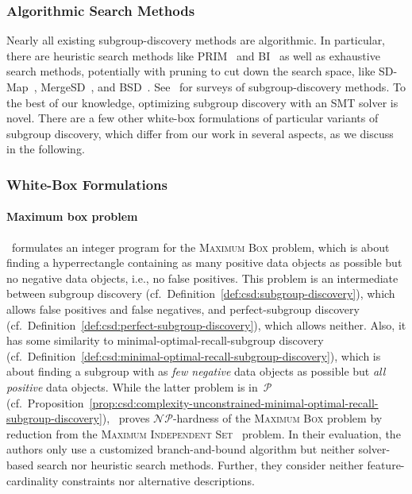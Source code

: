 \documentclass{article}
\theoremstyle{definition}
\begin{document}
\subsubsection{Algorithmic Search Methods}
\label{sec:csd:related-work:subgroup-discovery:algorithmic-methods}

Nearly all existing subgroup-discovery methods are algorithmic.
In particular, there are heuristic search methods like PRIM~\cite{friedman1999bump} and BI~\cite{mampaey2012efficient} as well as exhaustive search methods, potentially with pruning to cut down the search space, like SD-Map~\cite{atzmueller2009fast, atzmueller2006sd}, MergeSD~\cite{grosskreutz2009subgroup}, and BSD~\cite{lemmerich2016fast, lemmerich2010fast}.
See~\cite{atzmueller2015subgroup, helal2016subgroup, herrera2011overview, ventura2018subgroup} for surveys of subgroup-discovery methods.
To the best of our knowledge, optimizing subgroup discovery with an SMT solver is novel.
There are a few other white-box formulations of particular variants of subgroup discovery, which differ from our work in several aspects, as we discuss in the following.

\subsubsection{White-Box Formulations}
\label{sec:csd:related-work:subgroup-discovery:white-box}

\paragraph{Maximum box problem}

\cite{eckstein2002maximum}~formulates an integer program for the \textsc{Maximum Box} problem, which is about finding a hyperrectangle containing as many positive data objects as possible but no negative data objects, i.e., no false positives.
This problem is an intermediate between subgroup discovery (cf.~Definition~\ref{def:csd:subgroup-discovery}), which allows false positives and false negatives, and perfect-subgroup discovery (cf.~Definition~\ref{def:csd:perfect-subgroup-discovery}), which allows neither.
Also, it has some similarity to minimal-optimal-recall-subgroup discovery (cf.~Definition~\ref{def:csd:minimal-optimal-recall-subgroup-discovery}), which is about finding a subgroup with as \emph{few negative} data objects as possible but \emph{all positive} data objects.
While the latter problem is in~$\mathcal{P}$ (cf.~Proposition~\ref{prop:csd:complexity-unconstrained-minimal-optimal-recall-subgroup-discovery}), \cite{eckstein2002maximum}~proves $\mathcal{NP}$-hardness of the \textsc{Maximum Box} problem by reduction from the \textsc{Maximum Independent Set}~\cite{tarjan1977finding} problem.
In their evaluation, the authors only use a customized branch-and-bound algorithm but neither solver-based search nor heuristic search methods.
Further, they consider neither feature-cardinality constraints nor alternative descriptions.
\end{document}
